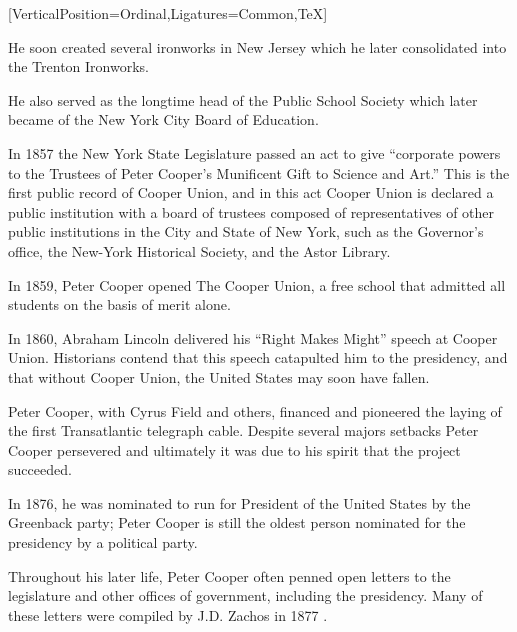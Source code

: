 \documentclass{article}
\begin{document}
\begin{minipage}[t]{0.46\linewidth}
[VerticalPosition=Ordinal,Ligatures={Common,TeX}]
\fontsize{11pt}{13pt}\selectfont
\raggedright
\upshape
\begin{enumList}
\setcounter{enumListi}{\value{enumTemp}}

\item He soon created several ironworks in New Jersey which he later
consolidated into the {\mdseries Trenton Ironworks}.

\item He also served as the longtime {\mdseries head of the Public School
Society} which later became of the New York City Board of Education.

\item In 1857 the New York State Legislature passed an act to give ``corporate
powers to the Trustees of Peter Cooper's Munificent Gift to Science and Art.''
This is the first public record of Cooper Union, and in this act Cooper Union
is declared a {\mdseries public institution with a board of trustees composed
of representatives of other public institutions in the City and State of New
York}, such as the Governor's office, the New-York Historical Society, and the
Astor Library.

\item In 1859, Peter Cooper opened The Cooper Union, a {\mdseries free school
that admitted all students on the basis of merit alone.}

\item In 1860, {\mdseries Abraham Lincoln} delivered his {\mdseries ``Right
Makes Might''} speech at Cooper Union. Historians contend that this speech
catapulted him to the presidency, and that {\mdseries without Cooper Union,
the United States may soon have fallen.}

\item Peter Cooper, with Cyrus Field and others, financed and pioneered the
laying of the {\mdseries first Transatlantic telegraph cable}. Despite several
majors setbacks Peter Cooper persevered and ultimately it was due to his
spirit that the project succeeded.

\item In 1876, he was {\mdseries nominated to run for President of the United
States} by the Greenback party; Peter Cooper is still the {\mdseries oldest
person} nominated for the presidency by a political party.

\item Throughout his later life, Peter Cooper often penned open letters to the
legislature and other offices of government, including the presidency. Many of
these letters were compiled by J.D. Zachos in 1877 \cite{opinions}.


\end{enumList}
\end{minipage}
\end{document}
